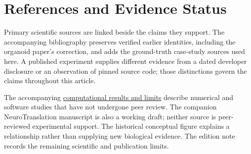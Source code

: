 \section{References and Evidence Status}

Primary scientific sources are linked beside the claims they support. The accompanying bibliography preserves verified earlier identities, including the organoid paper's correction, and adds the ground-truth case-study sources used here. A published experiment supplies different evidence from a dated developer disclosure or an observation of pinned source code; those distinctions govern the claims throughout this article.\par

The accompanying \href{research-evidence.json}{computational results and limits}
describe numerical and software studies that have not undergone peer review.
The companion NeuroTranslation manuscript is also a working draft; neither
source is peer-reviewed experimental support. The historical conceptual figure
explains a relationship rather than supplying new biological evidence. The
edition note records the remaining scientific and publication limits.\par

